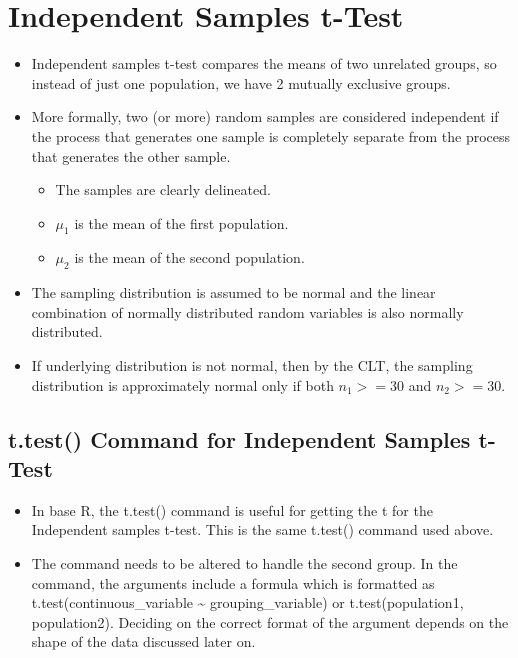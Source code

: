 \documentclass[
  letterpaper,
  DIV=11,
  numbers=noendperiod]{scrreprt}
\providecommand{\tightlist}{%
  \setlength{\itemsep}{0pt}\setlength{\parskip}{0pt}}\usepackage{longtable,booktabs,array}
\begin{document}

\chapter{Independent Samples t-Test}\label{independent-samples-t-test}

\begin{itemize}
\tightlist
\item
  Independent samples t-test compares the means of two unrelated groups,
  so instead of just one population, we have 2 mutually exclusive
  groups.
\item
  More formally, two (or more) random samples are considered independent
  if the process that generates one sample is completely separate from
  the process that generates the other sample.

  \begin{itemize}
  \tightlist
  \item
    The samples are clearly delineated.
  \item
    \(\mu_1\) is the mean of the first population.
  \item
    \(\mu_2\) is the mean of the second population.
  \end{itemize}
\item
  The sampling distribution is assumed to be normal and the linear
  combination of normally distributed random variables is also normally
  distributed.
\item
  If underlying distribution is not normal, then by the CLT, the
  sampling distribution is approximately normal only if both
  \(n_1 >= 30\) and \(n_2 >= 30\).
\end{itemize}

\section{t.test() Command for Independent Samples
t-Test}\label{t.test-command-for-independent-samples-t-test}

\begin{itemize}
\item
  In base R, the t.test() command is useful for getting the t for the
  Independent samples t-test. This is the same t.test() command used
  above.
\item
  The command needs to be altered to handle the second group. In the
  command, the arguments include a formula which is formatted as
  t.test(continuous\_variable \textasciitilde{} grouping\_variable) or
  t.test(population1, population2). Deciding on the correct format of
  the argument depends on the shape of the data discussed later on.
\end{itemize}
\end{document}
